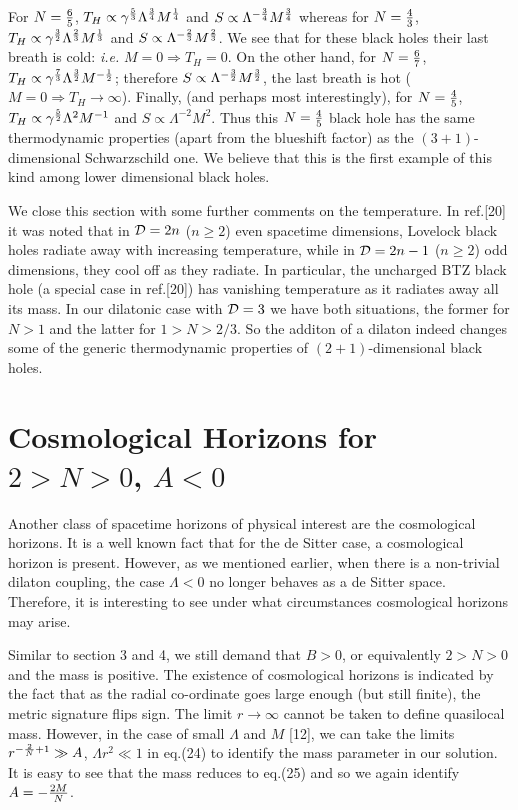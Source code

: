 \documentclass[12pt]{article}
\begin{document}
For $N={6\over 5}$, $T_{H}\propto \gamma^{5\over 3}
\Lambda^{{3\over4}}M^{{1\over4}}$ and
$S\propto\Lambda^{-{3\over4}}M^{{3\over4}}$ whereas for $N={4\over 3}$,
$T_{H}\propto\gamma^{3\over 2}\Lambda^{{2\over3}}M^{{1\over3}}$ and
$S\propto\Lambda^{-{2\over3}}M^{{2\over 3}}$. We see that for these black
holes their last breath is cold: {\sl i.e.} $M=0\Rightarrow T_H=0$.
On the other hand, for $N={{6\over 7}}$,
$T_{H}\propto\gamma^{7\over 3}\Lambda^{{3\over 2}}M^{-{1\over 2}}$;
therefore $S\propto\Lambda^{-{3\over2}}M^{{3\over2}}$, the last breath is
hot ($M=0\Rightarrow T_H\to\infty$). Finally, (and perhaps most
interestingly), for $N={4\over5}$, $T_{H}\propto\gamma^{5\over
2}{{\Lambda}^2}M^{-1}$ and $S\propto\Lambda^{-2}M^2$. Thus this
$N={4\over5}$ black hole has the same thermodynamic properties
(apart from the blueshift factor) as the
$(3+1)$-dimensional Schwarzschild one. We believe that this is the first
example of this kind among lower dimensional black holes.

We close this section with some further comments on the temperature. In
ref.[20] it was noted that in ${\cal D}=2n$ ($n\geq 2$) even spacetime
dimensions, Lovelock black holes radiate away with increasing temperature,
while in ${\cal D}=2n-1$ ($n\geq 2$) odd dimensions, they cool off as they
radiate. In particular, the uncharged BTZ black hole (a special case in
ref.[20]) has vanishing temperature as it radiates away all its mass.
In our dilatonic case  with ${\cal D}=3$ we have both situations,
the former for $N>1$ and the latter for $1>N>2/3$. So the additon of a
dilaton indeed changes some of the generic thermodynamic properties of
$(2+1)$-dimensional black holes.


\section{Cosmological Horizons for $2>N>0$, $A<0$}

Another class of spacetime horizons of physical interest are
the cosmological horizons. It is a well known fact that
for the de Sitter case, a cosmological horizon is present.
However, as we mentioned earlier, when there is a non-trivial
dilaton coupling, the case $\Lambda<0$  no longer behaves as a
de Sitter space. Therefore, it is interesting to see under
what circumstances cosmological horizons may arise.

Similar to section 3 and 4, we still demand that $B>0$, or equivalently
$2>N>0$ and the mass is positive.  The existence of cosmological horizons
is indicated by the fact that as the radial co-ordinate goes large enough
(but still finite), the metric signature flips sign. The limit $r\to\infty$
cannot be taken to define quasilocal mass. However, in the case of
small $\Lambda$ and $M$ [12], we can take the limits
$r^{-{2\over N}+1}\gg A$, $\Lambda r^2\ll 1$ in eq.(24) to identify the
mass parameter in our solution. It is easy to see that the mass reduces to
eq.(25) and so we again identify $A=-{2M\over N}$.
\end{document}
